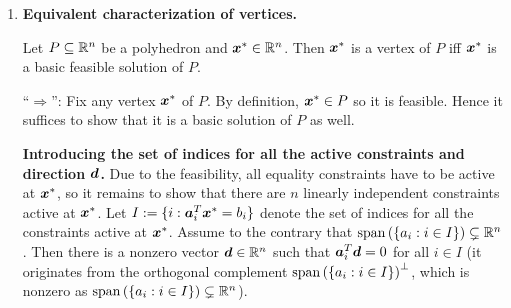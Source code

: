 \begin{enumerate}
\item \textbf{Equivalent characterization of vertices.}
\begin{theorem}
\label{thm:vertex-equiv-bfs}
Let \(P\subseteq \mathbb{R}^n\) be a polyhedron and \(\bm{x}^*\in\mathbb{R}^n\). Then
\(\bm{x}^*\) is a vertex of \(P\) iff \(\bm{x}^*\) is a basic feasible
solution of \(P\).
\end{theorem}
\begin{pf}
``\(\Rightarrow\)'': Fix any vertex \(\bm{x}^*\) of \(P\). By definition,
\(\bm{x}^*\in P\) so it is feasible. Hence it suffices to show that it is a
basic solution of \(P\) as well.

\textbf{Introducing the set of indices for all the active constraints and direction \(\bm{d}\).}
Due to the feasibility, all equality constraints have to be active at
\(\bm{x}^*\), so it remains to show that there are \(n\) linearly independent
constraints active at \(\bm{x}^*\). Let
\(I:=\{i:\bm{a}_i^{T}\bm{x}^*=b_i\}\) denote the set of indices for
all the constraints active at \(\bm{x}^*\). Assume to the contrary that \(\operatorname{span}\left(\{a_i:i\in
I\}\right)\subsetneq\mathbb{R}^n\). Then there is a nonzero vector
\(\bm{d}\in\mathbb{R}^n\) such that \(\bm{a}_i^{T}\bm{d}=0\) for all \(i\in I\)
(it originates from the orthogonal complement \(\operatorname{span}\left(\{a_i:i\in I\}\right)^{\perp}\),
which is nonzero as \(\operatorname{span}\left(\{a_i:i\in I\}\right)\subsetneq \mathbb{R}^n\)).


\end{pf}
\end{enumerate}

